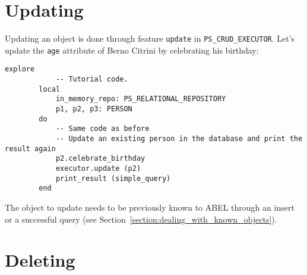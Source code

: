 \documentclass[a4paper,12pt]{report}
\begin{document}
%
%
%
%

\section{Updating}

Updating an object is done through feature \lstinline{update} in \lstinline{PS_CRUD_EXECUTOR}. Let's update the \lstinline{age} attribute of Berno Citrini by celebrating his birthday:

\begin{lstlisting}[language=OOSC2Eiffel, captionpos=b, caption={Printing the query result.}, label={lst:tutorial_print_result}]
	explore
			-- Tutorial code.
		local
			in_memory_repo: PS_RELATIONAL_REPOSITORY
			p1, p2, p3: PERSON
		do
			-- Same code as before
			-- Update an existing person in the database and print the result again
			p2.celebrate_birthday
			executor.update (p2)
			print_result (simple_query)		
		end
\end{lstlisting}
The object to update needs to be previously known to ABEL through an insert or a successful query (see Section~\ref{section:dealing_with_known_objects}).

\section{Deleting}
\label{section:simple_delete}
\end{document}
